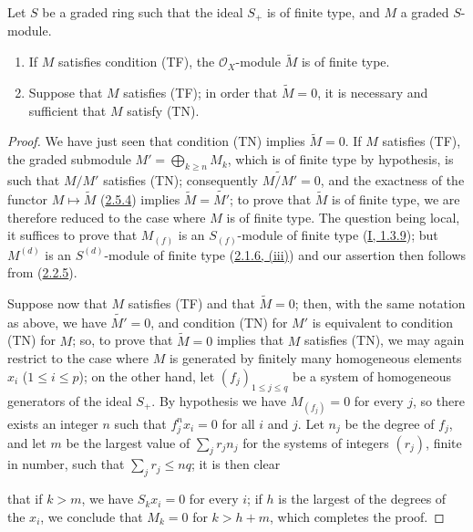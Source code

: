 \begin{proposition}[2.7.3]
\label{II.2.7.3}
Let $S$ be a graded ring such that the ideal $S_+$ is of finite type, and $M$ a
graded $S$-module.
\begin{enumerate}
  \item[\rm(i)] If $M$ satisfies condition (TF), the $\mathcal{O}_X$-module
    $\widetilde{M}$ is of finite type.
  \item[\rm(ii)] Suppose that $M$ satisfies (TF); in order that
    $\widetilde{M}=0$, it is necessary and sufficient that $M$ satisfy (TN).
\end{enumerate}
\end{proposition}

\begin{proof}
We have just seen that condition (TN) implies $\widetilde{M}=0$. If $M$
satisfies (TF), the graded submodule $M'=\bigoplus_{k\geq n}M_k$, which is of
finite type by hypothesis, is such that $M/M'$ satisfies (TN); consequently
$\widetilde{M/M'}=0$, and the exactness of the functor
$M\mapsto\widetilde{M}$ (\hyperref[II.2.5.4]{2.5.4}) implies
$\widetilde{M}=\widetilde{M'}$; to prove that $\widetilde{M}$ is of finite
type, we are therefore reduced to the case where $M$ is of finite type. The
question being local, it suffices to prove that $M_{(f)}$ is an
$S_{(f)}$-module of finite type (\hyperref[I.1.3.9]{I, 1.3.9}); but
$M^{(d)}$ is an $S^{(d)}$-module of finite type
(\hyperref[II.2.1.6]{2.1.6, (iii)}) and our assertion then follows from
(\hyperref[II.2.2.5]{2.2.5}).

Suppose now that $M$ satisfies (TF) and that $\widetilde{M}=0$; then, with
the same notation as above, we have $\widetilde{M'}=0$, and condition (TN)
for $M'$ is equivalent to condition (TN) for $M$; so, to prove that
$\widetilde{M}=0$ implies that $M$ satisfies (TN), we may again restrict to
the case where $M$ is generated by finitely many homogeneous elements $x_i$
($1\leq i\leq p$); on the other hand, let $(f_j)_{1\leq j\leq q}$ be a system
of homogeneous generators of the ideal $S_+$. By hypothesis we have
$M_{(f_j)}=0$ for every $j$, so there exists an integer $n$ such that
$f_j^nx_i=0$ for all $i$ and $j$. Let $n_j$ be the degree of $f_j$, and let
$m$ be the largest value of $\sum_jr_jn_j$ for the systems of integers
$(r_j)$, finite in number, such that $\sum_jr_j\leq nq$; it is then clear

that if $k>m$, we have $S_kx_i=0$ for every $i$; if $h$ is the largest of the
degrees of the $x_i$, we conclude that $M_k=0$ for $k>h+m$, which completes
the proof.
\end{proof}

